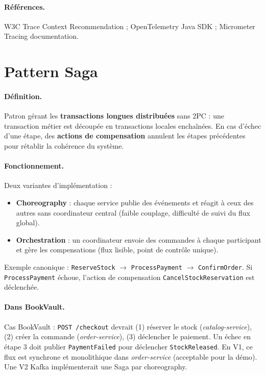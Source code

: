 \documentclass[12pt,a4paper]{report}
\begin{document}
\paragraph{Références.} W3C Trace Context Recommendation ; OpenTelemetry Java SDK ; Micrometer Tracing documentation.\par


\section{Pattern Saga}

\paragraph{Définition.} Patron gérant les \textbf{transactions longues distribuées} sans 2PC : une transaction métier est découpée en transactions locales enchaînées. En cas d'échec d'une étape, des \textbf{actions de compensation} annulent les étapes précédentes pour rétablir la cohérence du système.\par

\paragraph{Fonctionnement.} Deux variantes d'implémentation :
\begin{itemize}
  \item \textbf{Choreography} : chaque service publie des événements et réagit à ceux des autres sans coordinateur central (faible couplage, difficulté de suivi du flux global).
  \item \textbf{Orchestration} : un coordinateur envoie des commandes à chaque participant et gère les compensations (flux lisible, point de contrôle unique).
\end{itemize}
Exemple canonique : \texttt{ReserveStock} $\rightarrow$ \texttt{ProcessPayment} $\rightarrow$ \texttt{ConfirmOrder}. Si \texttt{ProcessPayment} échoue, l'action de compensation \texttt{CancelStockReservation} est déclenchée.\par

\paragraph{Dans BookVault.} Cas BookVault : \texttt{POST /checkout} devrait (1) réserver le stock (\textit{catalog-service}), (2) créer la commande (\textit{order-service}), (3) déclencher le paiement. Un échec en étape 3 doit publier \texttt{PaymentFailed} pour déclencher \texttt{StockReleased}. En V1, ce flux est synchrone et monolithique dans \textit{order-service} (acceptable pour la démo). Une V2 Kafka implémenterait une Saga par choreography.\par
\end{document}
